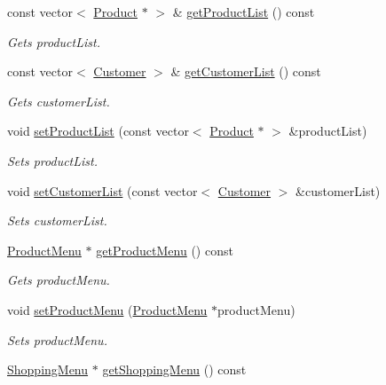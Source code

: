 \begin{DoxyCompactItemize}
\item 
const vector$<$ \hyperlink{classProduct}{Product} $\ast$ $>$ \& \hyperlink{classMainMenu_af797940403e4861707ec38b49c3bb877}{get\+Product\+List} () const 
\begin{DoxyCompactList}\small\item\em Gets product\+List. \end{DoxyCompactList}\item 
const vector$<$ \hyperlink{classCustomer}{Customer} $>$ \& \hyperlink{classMainMenu_a767a7b46b797999747042dbac8a7fa1b}{get\+Customer\+List} () const 
\begin{DoxyCompactList}\small\item\em Gets customer\+List. \end{DoxyCompactList}\item 
void \hyperlink{classMainMenu_a7e92c219fdadcfcf8d34d25d14ed90e0}{set\+Product\+List} (const vector$<$ \hyperlink{classProduct}{Product} $\ast$ $>$ \&product\+List)
\begin{DoxyCompactList}\small\item\em Sets product\+List. \end{DoxyCompactList}\item 
void \hyperlink{classMainMenu_aa78eaffbe8203475575aac6f330497c9}{set\+Customer\+List} (const vector$<$ \hyperlink{classCustomer}{Customer} $>$ \&customer\+List)
\begin{DoxyCompactList}\small\item\em Sets customer\+List. \end{DoxyCompactList}\item 
\hyperlink{classProductMenu}{Product\+Menu} $\ast$ \hyperlink{classMainMenu_a6803aa733e52be3d4987aea068da1f61}{get\+Product\+Menu} () const 
\begin{DoxyCompactList}\small\item\em Gets product\+Menu. \end{DoxyCompactList}\item 
void \hyperlink{classMainMenu_aaca12cbc08bfe9533544375cd8da5a8e}{set\+Product\+Menu} (\hyperlink{classProductMenu}{Product\+Menu} $\ast$product\+Menu)
\begin{DoxyCompactList}\small\item\em Sets product\+Menu. \end{DoxyCompactList}\item 
\hyperlink{classShoppingMenu}{Shopping\+Menu} $\ast$ \hyperlink{classMainMenu_aa85189f22902186d47c1610e9d92d911}{get\+Shopping\+Menu} () const 

\end{DoxyCompactItemize}

